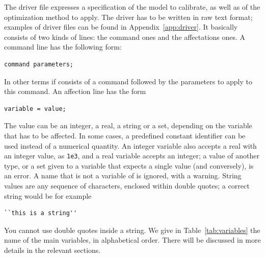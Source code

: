 The \amlet{} driver file expresses a specification of the model to
calibrate, as well as of the optimization method to apply.
The driver has to be written in raw text format; examples of driver
files can be found in Appendix~\ref{app:driver}.
It basically consists of two kinds of lines: the command ones and the
affectations ones.
A command line has the following form:
\begin{verbatim}
command parameters;
\end{verbatim}
In other terms if consists of a command followed by the parameters to
apply to this command. An affection line has the form
\begin{verbatim}
variable = value;
\end{verbatim}
The value can be an integer, a real, a string or a set, depending on the
variable that has to be affected. In some cases, a predefined constant
identifier can be used instead of a numerical quantity.
An integer variable also accepts a real with an integer value, as
\verb|1e3|, and a real variable accepts an integer; a value of another
type, or a set given to a variable that expects a single value (and
conversely), is an error. A name that is not a variable of \amlet{} is
ignored, with a warning. String values
are any sequence of characters, enclosed within double
quotes; a correct string would be for example
\begin{verbatim}
``this is a string''
\end{verbatim}
You cannot use double quotes inside a string.
We give in Table~\ref{tab:variables} the name of the main variables,
in alphabetical order. There will be discussed in more details in the
relevant sections.
